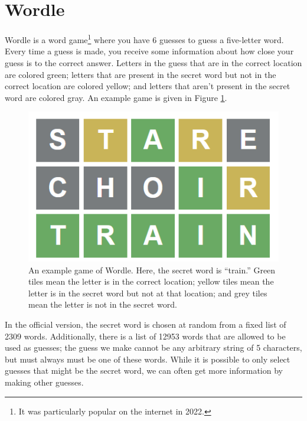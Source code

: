 
\section*{Wordle}
Wordle is a word game\footnote{It was particularly popular on the internet in 2022.} where you have 6 guesses to guess a five-letter word. 
Every time a guess is made, you receive some information about how close your guess is to the correct answer.
Letters in the guess that are in the correct location are colored green; letters that are present in the secret word but not in the correct location are colored yellow; and letters that aren't present in the secret word are colored gray.
An example game is given in Figure \ref{fig:wordle-example}.

\begin{figure}[H]
	\includegraphics{figures/wordle-example.png}
	\caption{
	\label{fig:wordle-example}
	An example game of Wordle. 
	Here, the secret word is ``train.''
	Green tiles mean the letter is in the correct location; yellow tiles mean the letter is in the secret word but not at that location; and grey tiles mean the letter is not in the secret word.
	}
\end{figure}

In the official version, the secret word is chosen at random from a fixed list of 2309 words.
Additionally, there is a list of 12953 words that are allowed to be used as guesses; the guess we make cannot be any arbitrary string of 5 characters, but must always must be one of these words.
While it is possible to only select guesses that might be the secret word, we can often get more information by making other guesses.

